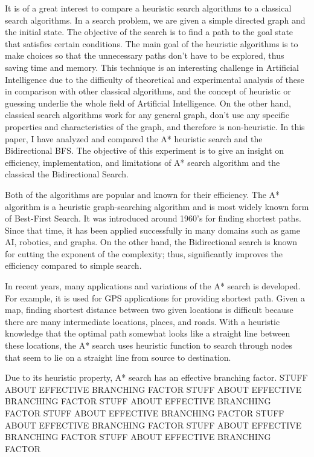 \documentclass[conference]{IEEEtran}
\begin{document}

It is of a great interest to compare a heuristic search algorithms to a classical search algorithms. In a search problem, we are given a simple directed graph and the initial state. The objective of the search is to find a path to the goal state that satisfies certain conditions. The main goal of the heuristic algorithms is to make choices so that the unnecessary paths don't have to be explored, thus saving time and memory. This technique is an interesting challenge in Artificial Intelligence due to the difficulty of theoretical and experimental analysis of these in comparison with other classical algorithms, and the concept of heuristic or guessing underlie the whole field of Artificial Intelligence. On the other hand, classical search algorithms work for any general graph, don't use any specific properties and characteristics of the graph, and therefore is non-heuristic. In this paper, I have analyzed and compared the A* heuristic search and the Bidirectional BFS. The objective of this experiment is to give an insight on efficiency, implementation, and limitations of A* search algorithm and the classical the Bidirectional Search.

Both of the algorithms are popular and known for their efficiency. The A* algorithm is a heuristic graph-searching algorithm and is most widely known form of Best-First Search. It was introduced around 1960's for finding shortest paths. Since that time, it has been applied successfully in many domains such as game AI, robotics, and graphs. On the other hand, the Bidirectional search is known for cutting the exponent of the complexity; thus, significantly improves the efficiency compared to simple search.

In recent years, many applications and variations of the A* search is developed. For example, it is used for GPS applications for providing shortest path. Given a map, finding shortest distance between two given locations is difficult because there are many intermediate locations, places, and roads. With a heuristic knowledge that the optimal path somewhat looks like a straight line between these locations, the A* search uses heuristic function to search through nodes that seem to lie on a straight line from source to destination.

Due to its heuristic property, A* search has an effective branching factor. 
STUFF ABOUT EFFECTIVE BRANCHING FACTOR
STUFF ABOUT EFFECTIVE BRANCHING FACTOR
STUFF ABOUT EFFECTIVE BRANCHING FACTOR
STUFF ABOUT EFFECTIVE BRANCHING FACTOR
STUFF ABOUT EFFECTIVE BRANCHING FACTOR
STUFF ABOUT EFFECTIVE BRANCHING FACTOR
STUFF ABOUT EFFECTIVE BRANCHING FACTOR
\end{document}

